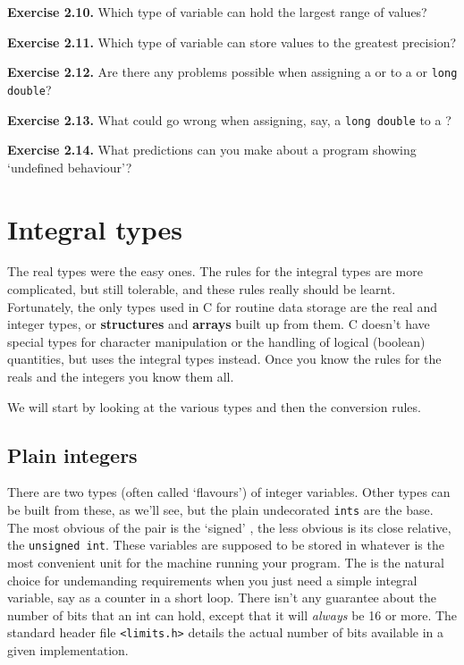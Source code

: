   

  

   \textbf{Exercise 2.10.} Which type of variable can hold the largest range of
    values?


   \textbf{Exercise 2.11.} Which type of variable can store values to the
    greatest precision?


   \textbf{Exercise 2.12.} Are there any problems possible when assigning a
    \float{} or \double{} to a \double{} or
    \texttt{long double}?


   \textbf{Exercise 2.13.} What could go wrong when assigning, say, a \texttt{long
    double} to a \double?


   \textbf{Exercise 2.14.} What predictions can you make about a program showing
    `undefined behaviour'?


  

 
        \section{Integral types}
        

  

  The real types were the easy ones. The rules for the integral types are
   more complicated, but still tolerable, and these rules really should be
   learnt. Fortunately, the only types used in C for routine data storage are
   the real and integer types, or \textbf{structures} and \textbf{arrays}
   built up from them. C doesn't have special types for character
   manipulation or the handling of logical (boolean) quantities, but uses the
   integral types instead. Once you know the rules for the reals and the
   integers you know them all.


  We will start by looking at the various types and then the conversion
   rules.


  \subsection{Plain integers}
   

   There are two types (often called `flavours') of integer
    variables. Other types can be built from these, as we'll see, but the
    plain undecorated \texttt{ints} are the base. The most obvious of the
    pair is the `signed' \kint, the less obvious is its close
    relative, the \texttt{unsigned int}. These variables are supposed to
    be stored in whatever is the most convenient unit for the machine running
    your program. The \kint{} is the natural choice for undemanding
    requirements when you just need a simple integral variable, say as a
    counter in a short loop. There isn't any guarantee about the number of
    bits that an int can hold, except that it will \textit{always} be 16 or
    more. The standard header file \texttt{<limits.h>} details the
    actual number of bits available in a given implementation.


